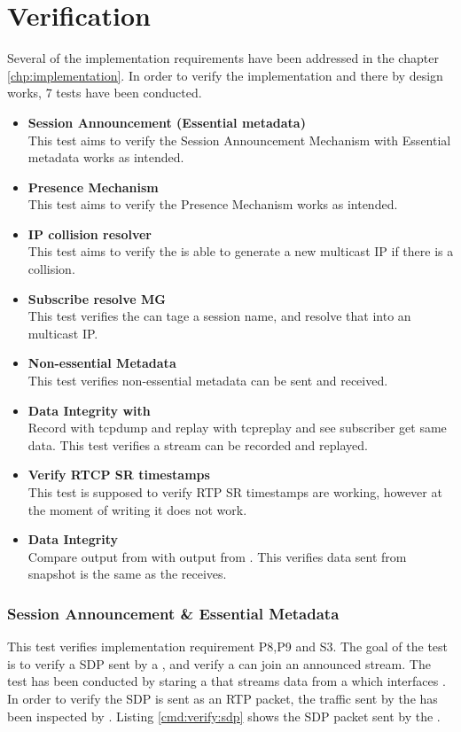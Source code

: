 \chapter{Verification} \label{sec:design:verification}
Several of the implementation requirements have been addressed in the chapter \ref{chp:implementation}. In order to verify the implementation and there by design works, 7 tests have been conducted.

\begin{itemize}
	\item \textbf{Session Announcement (Essential metadata)}\\
This test aims to verify the Session Announcement Mechanism with Essential metadata works as intended.
	\item \textbf{Presence Mechanism}\\
This test aims to verify the Presence Mechanism works as intended.
	\item \textbf{IP collision resolver}\\
This test aims to verify the \pub{} is able to generate a new multicast IP if there is a collision.
	\item \textbf{Subscribe resolve MG}\\
This test verifies the \sub{} can tage a session name, and resolve that into an multicast IP.
	\item \textbf{Non-essential Metadata}\\
This test verifies non-essential metadata can be sent and received.
	\item \textbf{Data Integrity with \hist{}}\\
Record with tcpdump and replay with tcpreplay and see subscriber get same data.
This test verifies a stream can be recorded and replayed.
	\item \textbf{Verify RTCP SR timestamps}\\
This test is supposed to verify RTP SR timestamps are working, however at the moment of writing it does not work.
	\item \textbf{Data Integrity}\\
	Compare output from \con{} with output from .
This verifies data sent from snapshot is the same as the \con{} receives.
\end{itemize}

\subsection{Session Announcement \& Essential Metadata} \label{sec:verify:sessionannouncement}
This test verifies implementation requirement P8,P9 and S3. The goal of the test is to verify a SDP sent by a \pub{}, and verify a \sub{} can join an announced stream. 
The test has been conducted by staring a \pub{} that streams data from a \con{} which interfaces . In order to verify the SDP is sent as an RTP packet, the traffic sent by the \pub{} has been inspected by . Listing \ref{cmd:verify:sdp} shows the SDP packet sent by the \pub{}.

